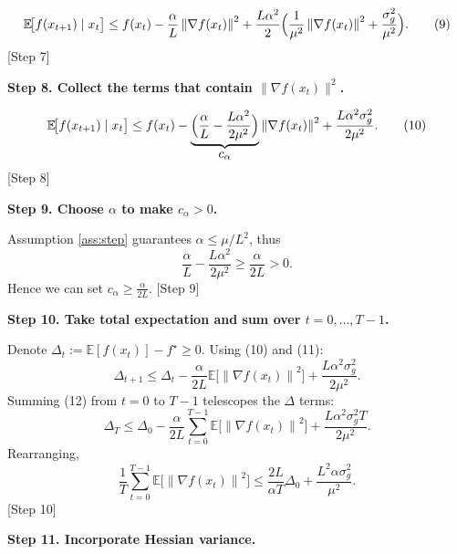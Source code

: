 \documentclass{article}
\newcommand{\E}{\mathbb{E}}
\newcommand{\norm}[1]{\left\lVert#1\right\rVert}
\newcommand{\grad}{\nabla}
\begin{document}
\[
\E\!\bigl[f(x_{t+1})\mid x_t\bigr]\le
f(x_t)-\frac{\alpha}{L}\norm{\grad f(x_t)}^{2}
+\frac{L\alpha^{2}}{2}\Bigl(\frac{1}{\mu^{2}}\norm{\grad f(x_t)}^{2}
+\frac{\sigma_g^{2}}{\mu^{2}}\Bigr).
\tag{9}
\]
[Step 7]

\noindent\textbf{Step 8. Collect the terms that contain $\|\grad f(x_t)\|^{2}$.}  

\[
\E\!\bigl[f(x_{t+1})\mid x_t\bigr]\le
f(x_t)-\underbrace{\Bigl(\frac{\alpha}{L}-\frac{L\alpha^{2}}{2\mu^{2}}\Bigr)}_{\displaystyle c_{\alpha}}
\norm{\grad f(x_t)}^{2}
+\frac{L\alpha^{2}\sigma_g^{2}}{2\mu^{2}}.
\tag{10}
\]
[Step 8]

\noindent\textbf{Step 9. Choose $\alpha$ to make $c_{\alpha}>0$.}  

Assumption \ref{ass:step} guarantees $\alpha\le \mu/L^{2}$, thus
\[
\frac{\alpha}{L}-\frac{L\alpha^{2}}{2\mu^{2}}
\ge \frac{\alpha}{2L}>0.
\tag{11}
\]
Hence we can set $c_{\alpha}\ge \frac{\alpha}{2L}$.  
[Step 9]

\noindent\textbf{Step 10. Take total expectation and sum over $t=0,\dots,T-1$.}  

Denote $\Delta_t:=\E[f(x_t)]-f^{\star}\ge0$. Using (10) and (11):
\[
\Delta_{t+1}\le\Delta_t-\frac{\alpha}{2L}\E\!\bigl[\norm{\grad f(x_t)}^{2}\bigr]
+\frac{L\alpha^{2}\sigma_g^{2}}{2\mu^{2}}.
\tag{12}
\]
Summing (12) from $t=0$ to $T-1$ telescopes the $\Delta$ terms:
\[
\Delta_T\le \Delta_0-\frac{\alpha}{2L}\sum_{t=0}^{T-1}\E\!\bigl[\norm{\grad f(x_t)}^{2}\bigr]
+\frac{L\alpha^{2}\sigma_g^{2}T}{2\mu^{2}}.
\tag{13}
\]
Rearranging,
\[
\frac{1}{T}\sum_{t=0}^{T-1}\E\!\bigl[\norm{\grad f(x_t)}^{2}\bigr]
\le\frac{2L}{\alpha T}\Delta_0
+\frac{L^{2}\alpha\sigma_g^{2}}{\mu^{2}}.
\tag{14}
\]
[Step 10]

\noindent\textbf{Step 11. Incorporate Hessian variance.}  
\end{document}
